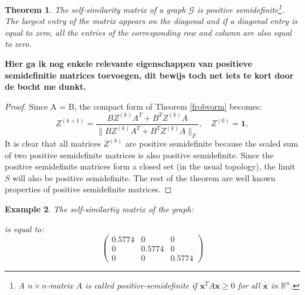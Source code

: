 \documentclass[a4paper,11pt]{report}
\newtheorem{theorem}{Theorem}[section]
\newtheorem{example}[theorem]{Example}
\newcommand{\R}{{\mathbb R}}
\newcommand{\graf}{\mathscr{G}}
\begin{document}
\begin{theorem}
  The self-similarity matrix of a graph $\graf$ is positive semidefinite\footnote{A $n\times n$-matrix $A$ is called positive-semidefinite if
$\mathbf{x}^{T} A \mathbf{x}\geq 0$
for all $\mathbf{x}$ in $\R^n$.}. The largest entry of the matrix appears on the 
diagonal and if a diagonal entry is equal to zero,  all the entries of the corresponding row and 
column are also equal to zero.
\end{theorem}
\textbf{Hier ga ik nog enkele relevante eigenschappen van positieve semidefinitie matrices toevoegen, dit bewijs toch net iets te kort door de bocht me dunkt.}
\begin{proof}
  Since A = B, the compact form of Theorem \ref{frobvorm} becomes:
 $$Z^{(k+1)} = \frac{BZ^{(k)}A^T + B^TZ^{(k)}A}{\|BZ^{(k)}A^T + B^TZ^{(k)}A\|_F}, \quad Z^{(0)} = \mathbf{1},  $$
  It is clear that all matrices $Z^{(k)}$ are positive semidefinite because the 
  scaled sum of two positive semidefinite matrices is also positive 
  semidefinite. Since the positive semidefinite matrices form a closed set (in the usual 
  topology), the limit $S$ will also be positive semidefinite. The rest of the 
  theorem are well known properties of positive semidefinite matrices.
\end{proof}
\begin{example}
  The self-similartiy matrix of the graph:
  \begin{center}
\end{center}
is equal to:
$$\begin{pmatrix}
  0.5774 & 0 & 0 \\
  0 & 0.5774 & 0 \\
  0 & 0 & 0.5774
\end{pmatrix}$$
\end{example}
\end{document}
